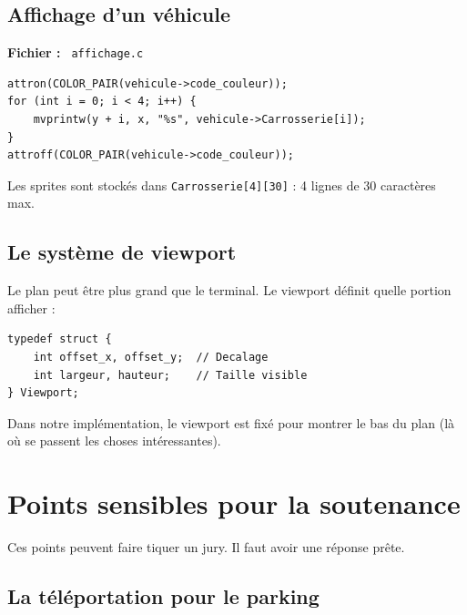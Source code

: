 \documentclass[11pt,a4paper]{article}
\newcommand{\fichier}[1]{\texttt{\textcolor{primary}{\faIcon{file-code} #1}}}
\newcommand{\variable}[1]{\texttt{\textcolor{success}{#1}}}
\begin{document}
\subsection{Affichage d'un véhicule}

\begin{funcbox}
\textbf{Fichier :} \fichier{affichage.c}

\begin{lstlisting}
attron(COLOR_PAIR(vehicule->code_couleur));
for (int i = 0; i < 4; i++) {
    mvprintw(y + i, x, "%s", vehicule->Carrosserie[i]);
}
attroff(COLOR_PAIR(vehicule->code_couleur));
\end{lstlisting}
\end{funcbox}

Les sprites sont stockés dans \variable{Carrosserie[4][30]} : 4 lignes de 30 caractères max.

\subsection{Le système de viewport}

Le plan peut être plus grand que le terminal. Le viewport définit quelle portion afficher :

\begin{lstlisting}
typedef struct {
    int offset_x, offset_y;  // Decalage
    int largeur, hauteur;    // Taille visible
} Viewport;
\end{lstlisting}

Dans notre implémentation, le viewport est fixé pour montrer le bas du plan (là où se passent les choses intéressantes).

\section{Points sensibles pour la soutenance}

\begin{dangerbox}[Attention]
Ces points peuvent faire tiquer un jury. Il faut avoir une réponse prête.
\end{dangerbox}

\subsection{La téléportation pour le parking}
\end{document}
